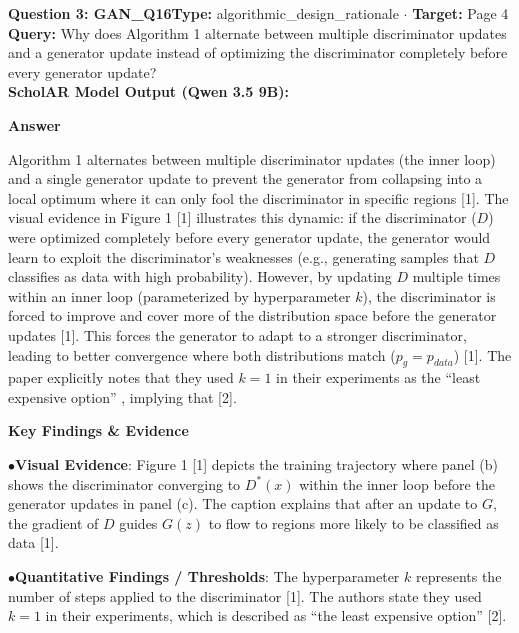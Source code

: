 \documentclass[10pt,a4paper]{article}
\begin{document}
\begin{tcolorbox}[questionbox]
{\noindent\bfseries\large\color{navy} Question 3: GAN\_Q16}\hfill {\footnotesize\color{darkteal}\textbf{Type:} algorithmic\_design\_rationale $\cdot$ \textbf{Target:} Page 4}\\[4pt]
{\noindent\bfseries\color{accentblue} Query: } Why does Algorithm 1 alternate between multiple discriminator updates and a generator update instead of optimizing the discriminator completely before every generator update?\\[6pt]
{\noindent\bfseries\color{navy} ScholAR Model Output (Qwen 3.5 9B):}\\[2pt]
{\small \noindent \textbf{Answer}\par\vspace{3pt}Algorithm 1 alternates between multiple discriminator updates (the inner loop) and a single generator update to prevent the generator from collapsing into a local optimum where it can only fool the discriminator in specific regions [1]. The visual evidence in Figure 1 [1] illustrates this dynamic: if the discriminator ($D$) were optimized completely before every generator update, the generator would learn to exploit the discriminator's weaknesses (e.g., generating samples that $D$ classifies as data with high probability). However, by updating $D$ multiple times within an inner loop (parameterized by hyperparameter $k$), the discriminator is forced to improve and cover more of the distribution space before the generator updates [1]. This forces the generator to adapt to a stronger discriminator, leading to better convergence where both distributions match ($p_g = p_{data}$) [1]. The paper explicitly notes that they used $k=1$ in their experiments as the ``least expensive option'' , implying that [2].\par\vspace{3pt}\noindent \textbf{Key Findings \& Evidence}\par\vspace{3pt}\noindent\hspace*{8pt}$\bullet$\hspace*{4pt}\textbf{Visual Evidence}: Figure 1 [1] depicts the training trajectory where panel (b) shows the discriminator converging to $D^*(x)$ within the inner loop before the generator updates in panel (c). The caption explains that after an update to $G$, the gradient of $D$ guides $G(z)$ to flow to regions more likely to be classified as data [1].\par\vspace{3pt}\noindent\hspace*{8pt}$\bullet$\hspace*{4pt}\textbf{Quantitative Findings / Thresholds}: The hyperparameter $k$ represents the number of steps applied to the discriminator [1]. The authors state they used $k=1$ in their experiments, which is described as ``the least expensive option'' [2].}\\[6pt]

\end{tcolorbox}
\end{document}
